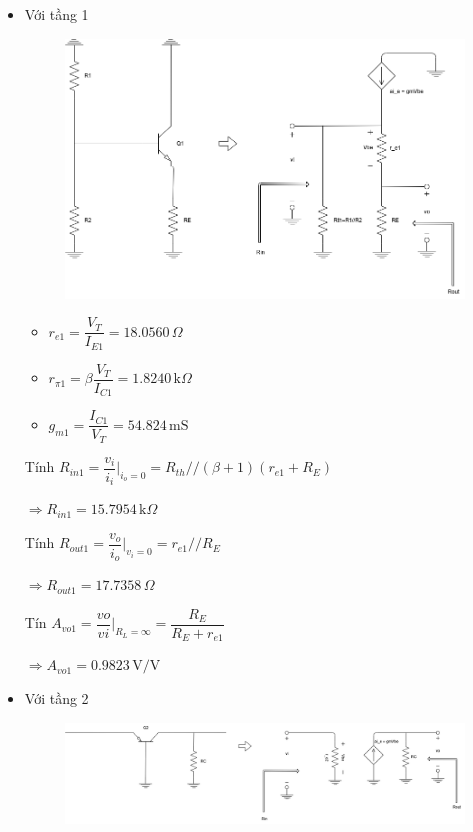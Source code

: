 \begin{itemize}[label=-]
	\item Với tầng 1
	
	\begin{figure}[H]
		\centering
		\includegraphics[width=.8\linewidth]{./my-chapters/my-diagrams/Question5/cauc_stage1.png}
	\end{figure}
	
	\begin{itemize}[label=+, leftmargin=2cm]
		\item $r_{e1} = \dfrac{V_{T}}{I_{E1}} = 18.0560\,\Omega$
		\item $r_{\pi1} = \beta\dfrac{V_{T}}{I_{C1}} = 1.8240\,\text{k}\Omega$
		\item $g_{m1} = \dfrac{I_{C1}}{V_{T}} = 54.824\,\text{mS}$
	\end{itemize}
	
	Tính $R_{in1} = \dfrac{v_{i}}{i_{i}}|_{i_{o} = 0} = R_{th} // (\beta + 1)(r_{e1} + R_{E})$
	
	$\Rightarrow R_{in1} = 15.7954\,\text{k}\Omega$
	
	Tính $R_{out1} = \dfrac{v_{o}}{i_{o}}|_{v_{i} = 0} = r_{e1} // R_{E}$
	
	$\Rightarrow R_{out1} = 17.7358\,\Omega$
	
	Tín $A_{vo1} = \dfrac{vo}{vi}|_{R_{L} = \infty} = \dfrac{R_{E}}{R_{E} + r_{e1}}$
	
	$\Rightarrow A_{vo1} = 0.9823\,\text{V/V}$
	\item Với tầng 2
	
	\begin{figure}[H]
		\centering
		\includegraphics[width=.8\linewidth]{./my-chapters/my-diagrams/Question5/cauc_stagte2.png}
	\end{figure}
	

\end{itemize}
